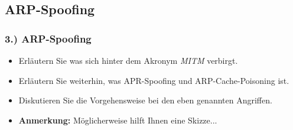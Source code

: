 \documentclass[xcolor=dvipsnames, aspectratio=169]{beamer}
\begin{document}
\subsection{ARP-Spoofing}
\begin{frame}
\frametitle{3.) ARP-Spoofing}
	\begin{itemize}
		\item Erläutern Sie was sich hinter dem Akronym \emph{MITM} verbirgt.
		\item Erläutern Sie weiterhin, was APR-Spoofing und ARP-Cache-Poisoning ist.
		\item Diskutieren Sie die Vorgehensweise bei den eben genannten Angriffen. 
		\item \textbf{Anmerkung:} Möglicherweise hilft Ihnen eine Skizze...
	\end{itemize}
\end{frame}
\end{document}
